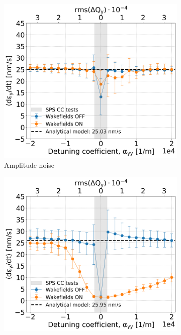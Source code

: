 \begin{figure}[!ht]
    \centering
    \begin{subfigure}[t]{0.45\textwidth}
        \centering
        \includegraphics[width=1\textwidth]{images/Ch7/deyRates_final_2018_AN_sps_270GeV_PN1e-8_200MHz_y-plane_QpxQpy5e-1_6D_Nb5e5_intensity3e10_ayyScan_wakesON_vs_OFF_vs_TuneSpreadvsExpectedSPS_200MHz.png}
        \caption{Amplitude noise}
    \end{subfigure}
    \hfill
    \begin{subfigure}[t]{0.45\textwidth}
        \centering
        \includegraphics[width=1\textwidth]{images/Ch7/deyRates_final_2018_PN_sps_270GeV_PN1e-8_200MHz_y-plane_QpxQpy5e-1_6D_Nb5e5_intensity3e10_ayyScan_wakesON_vs_OFF_vs_TuneSpreadvsExpectedSPS_200MHz.png}

\end{subfigure}
\end{figure}
